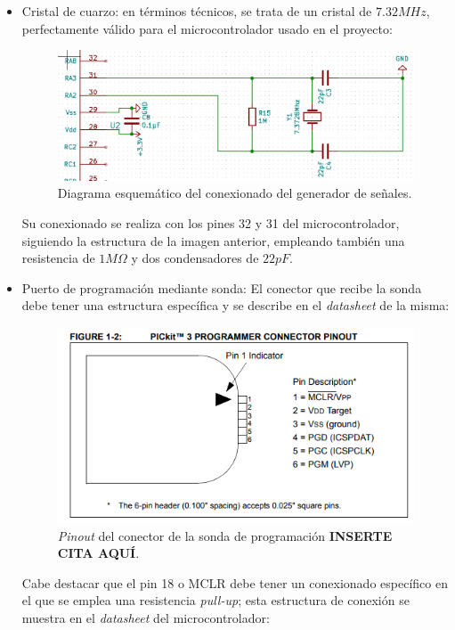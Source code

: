 \begin{itemize}
    \item Cristal de cuarzo: en términos técnicos, se trata de un cristal de $7.32MHz$, perfectamente válido para el microcontrolador usado en el proyecto:
    
    \begin{figure}[H]
    \centering 
    \includegraphics[width=.7\linewidth]{pictures/Cristal.PNG}
    \caption{Diagrama esquemático del conexionado del generador de señales.}
    \label{fig:CAMBIAR!!!!!!!!!!}
    \end{figure}
    
    Su conexionado se realiza con los pines 32 y 31 del microcontrolador, siguiendo la estructura de la imagen anterior, empleando también una resistencia de $1 M \Omega$ y dos condensadores de $22 pF$.
    
    \item Puerto de programación mediante sonda: El conector que recibe la sonda debe tener una estructura específica y se describe en el \textit{datasheet} de la misma:
    
    \begin{figure}[H]
    \centering 
    \includegraphics[width=.5\linewidth]{pictures/Sonda.PNG}
    \caption{\textit{Pinout} del conector de la sonda de programación \textbf{INSERTE CITA AQUÍ}.}
    \label{fig:CAMBIAR!!!!!!!!!!}
    \end{figure}
    
     Cabe destacar que el pin 18 o MCLR debe tener un conexionado específico en el que se emplea una resistencia \textit{pull-up}; esta estructura de conexión se muestra en el \textit{datasheet} del microcontrolador:
     

\end{itemize}
